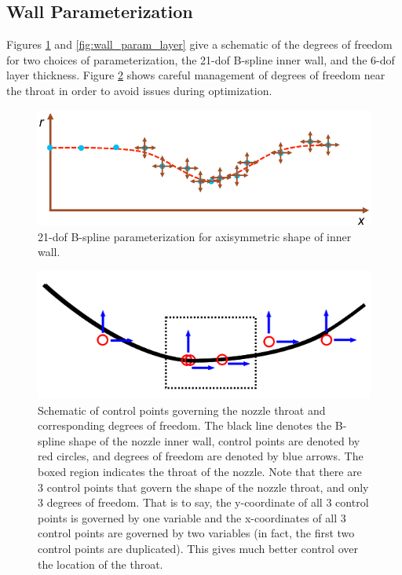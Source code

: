 \documentclass{article}
\begin{document}
\subsection{Wall Parameterization}

Figures \ref{fig:wall_param_bspline} and \ref{fig:wall_param_layer} give a schematic of the degrees of freedom for two choices of parameterization, the 21-dof B-spline inner wall, and the 6-dof layer thickness. Figure \ref{fig:throatDofs} shows careful management of degrees of freedom near the throat in order to avoid issues during optimization.

\begin{figure}
\caption{21-dof B-spline parameterization for axisymmetric shape of inner wall.}
\label{fig:wall_param_bspline}
\begin{center}
\includegraphics[scale=0.4]{figs/bspline_parameterization.png}
\end{center}
\end{figure}

\begin{figure}
\caption{Schematic of control points governing the nozzle throat and corresponding degrees of freedom. The black line denotes the B-spline shape of the nozzle inner wall, control points are denoted by red circles, and degrees of freedom are denoted by blue arrows. The boxed region indicates the throat of the nozzle. Note that there are 3 control points that govern the shape of the nozzle throat, and only 3 degrees of freedom. That is to say, the y-coordinate of all 3 control points is governed by one variable and the x-coordinates of all 3 control points are governed by two variables (in fact, the first two control points are duplicated). This gives much better control over the location of the throat.}
\label{fig:throatDofs}
\begin{center}
\includegraphics[scale=0.5]{figs/throat_area_control_points.png}
\end{center}
\end{figure}
\end{document}
